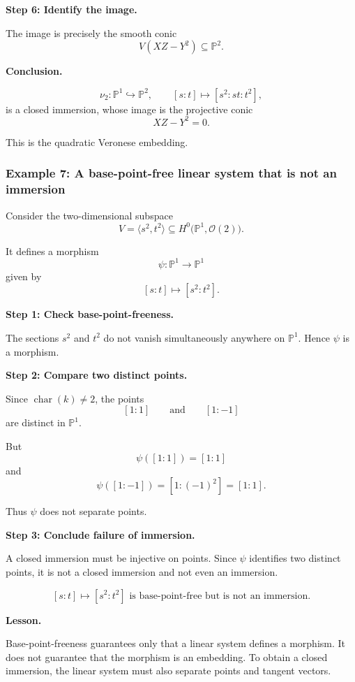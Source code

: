 \documentclass[12pt,a4paper]{article}
\theoremstyle{notespace}
\begin{document}
\textbf{Step 6: Identify the image.}

The image is precisely the smooth conic
\[
V(XZ-Y^{2})\subseteq \mathbb{P}^{2}.
\]

\textbf{Conclusion.}

\[
\boxed{
	\nu_{2}:\mathbb{P}^{1}\hookrightarrow \mathbb{P}^{2},
	\qquad
	[s:t]\longmapsto [s^{2}:st:t^{2}],
}
\]
is a closed immersion, whose image is the projective conic
\[
XZ-Y^{2}=0.
\]

This is the quadratic Veronese embedding.

\subsubsection{Example 7: A base-point-free linear system that is not an immersion}

Consider the two-dimensional subspace
\[
V=\langle s^{2},t^{2}\rangle
\subseteq
H^{0}\bigl(\mathbb{P}^{1},\mathcal{O}(2)\bigr).
\]

It defines a morphism
\[
\psi:\mathbb{P}^{1}\longrightarrow \mathbb{P}^{1}
\]
given by
\[
[s:t]\longmapsto [s^{2}:t^{2}].
\]

\textbf{Step 1: Check base-point-freeness.}

The sections \(s^{2}\) and \(t^{2}\) do not vanish simultaneously anywhere on \(\mathbb{P}^{1}\). Hence \(\psi\) is a morphism.

\textbf{Step 2: Compare two distinct points.}

Since \(\operatorname{char}(k)\neq 2\), the points
\[
[1:1]
\qquad\text{and}\qquad
[1:-1]
\]
are distinct in \(\mathbb{P}^{1}\).

But
\[
\psi([1:1])
=
[1:1]
\]
and
\[
\psi([1:-1])
=
[1:(-1)^{2}]
=
[1:1].
\]

Thus \(\psi\) does not separate points.

\textbf{Step 3: Conclude failure of immersion.}

A closed immersion must be injective on points. Since \(\psi\) identifies two distinct points, it is not a closed immersion and not even an immersion.

\[
\boxed{
	[s:t]\longmapsto [s^{2}:t^{2}]
	\text{ is base-point-free but is not an immersion.}
}
\]

\textbf{Lesson.}

Base-point-freeness guarantees only that a linear system defines a morphism. It does not guarantee that the morphism is an embedding. To obtain a closed immersion, the linear system must also separate points and tangent vectors.
\end{document}
